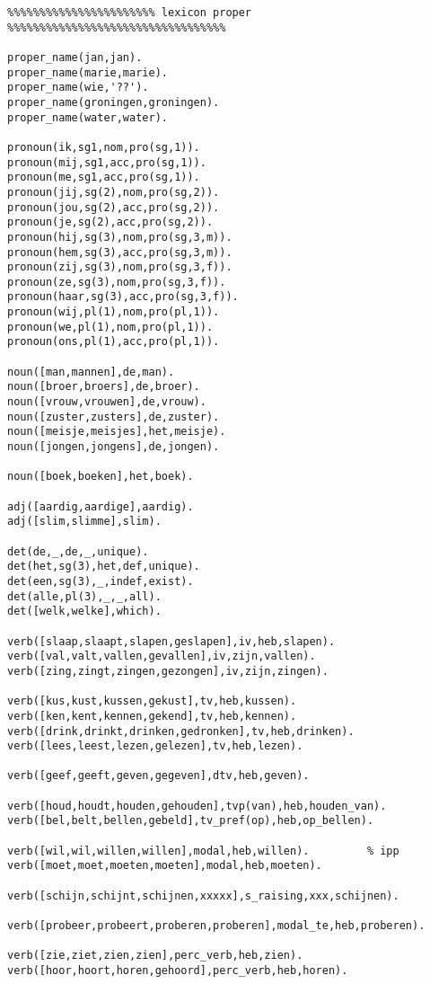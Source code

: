 \begin{verbatim}
%%%%%%%%%%%%%%%%%%%%%%% lexicon proper %%%%%%%%%%%%%%%%%%%%%%%%%%%%%%%%%%

proper_name(jan,jan).
proper_name(marie,marie).
proper_name(wie,'??').
proper_name(groningen,groningen).
proper_name(water,water).

pronoun(ik,sg1,nom,pro(sg,1)).
pronoun(mij,sg1,acc,pro(sg,1)).
pronoun(me,sg1,acc,pro(sg,1)).
pronoun(jij,sg(2),nom,pro(sg,2)).
pronoun(jou,sg(2),acc,pro(sg,2)).
pronoun(je,sg(2),acc,pro(sg,2)).
pronoun(hij,sg(3),nom,pro(sg,3,m)).
pronoun(hem,sg(3),acc,pro(sg,3,m)).
pronoun(zij,sg(3),nom,pro(sg,3,f)).
pronoun(ze,sg(3),nom,pro(sg,3,f)).
pronoun(haar,sg(3),acc,pro(sg,3,f)).
pronoun(wij,pl(1),nom,pro(pl,1)).
pronoun(we,pl(1),nom,pro(pl,1)).
pronoun(ons,pl(1),acc,pro(pl,1)).

noun([man,mannen],de,man).
noun([broer,broers],de,broer).
noun([vrouw,vrouwen],de,vrouw).
noun([zuster,zusters],de,zuster).
noun([meisje,meisjes],het,meisje).
noun([jongen,jongens],de,jongen).

noun([boek,boeken],het,boek).

adj([aardig,aardige],aardig).
adj([slim,slimme],slim).

det(de,_,de,_,unique).
det(het,sg(3),het,def,unique).
det(een,sg(3),_,indef,exist).
det(alle,pl(3),_,_,all).
det([welk,welke],which).

verb([slaap,slaapt,slapen,geslapen],iv,heb,slapen).
verb([val,valt,vallen,gevallen],iv,zijn,vallen).
verb([zing,zingt,zingen,gezongen],iv,zijn,zingen).     
  
verb([kus,kust,kussen,gekust],tv,heb,kussen).
verb([ken,kent,kennen,gekend],tv,heb,kennen).
verb([drink,drinkt,drinken,gedronken],tv,heb,drinken).
verb([lees,leest,lezen,gelezen],tv,heb,lezen).

verb([geef,geeft,geven,gegeven],dtv,heb,geven).

verb([houd,houdt,houden,gehouden],tvp(van),heb,houden_van).
verb([bel,belt,bellen,gebeld],tv_pref(op),heb,op_bellen).

verb([wil,wil,willen,willen],modal,heb,willen).         % ipp
verb([moet,moet,moeten,moeten],modal,heb,moeten).       

verb([schijn,schijnt,schijnen,xxxxx],s_raising,xxx,schijnen).

verb([probeer,probeert,proberen,proberen],modal_te,heb,proberen).

verb([zie,ziet,zien,zien],perc_verb,heb,zien).
verb([hoor,hoort,horen,gehoord],perc_verb,heb,horen).



\end{verbatim}
